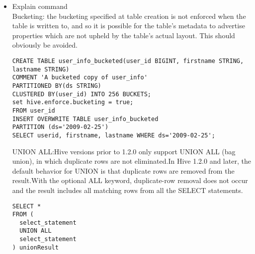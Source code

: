 \documentclass[12pt]{article}
\begin{document}
\begin{itemize}
	  	\item Explain command\\
		Bucketing: the bucketing specified at table creation is not enforced when the table is written to, and so it is possible for the table's metadata to advertise properties which are not upheld by the table's actual layout. This should obviously be avoided. 
		\begin{lstlisting}
CREATE TABLE user_info_bucketed(user_id BIGINT, firstname STRING, lastname STRING)
COMMENT 'A bucketed copy of user_info'
PARTITIONED BY(ds STRING)
CLUSTERED BY(user_id) INTO 256 BUCKETS;
set hive.enforce.bucketing = true; 
FROM user_id
INSERT OVERWRITE TABLE user_info_bucketed
PARTITION (ds='2009-02-25')
SELECT userid, firstname, lastname WHERE ds='2009-02-25';
\end{lstlisting}
		UNION ALL:Hive versions prior to 1.2.0 only support UNION ALL (bag union), in which duplicate rows are not eliminated.In Hive 1.2.0 and later, the default behavior for UNION is that duplicate rows are removed from the result.With the optional ALL keyword, duplicate-row removal does not occur and the result includes all matching rows from all the SELECT statements.
		\begin{lstlisting}
SELECT *
FROM (
  select_statement
  UNION ALL
  select_statement
) unionResult
\end{lstlisting}

	\end{itemize}
	
\end{document}
